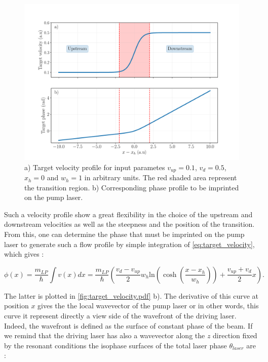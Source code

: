 \begin{figure}[h]
    \centering
    \includegraphics[width=1\textwidth]{chap3_custom_st/fig/target_velocity.pdf}
    \caption{ a) Target velocity profile for input parametes $v_{up}=0.1$, $v_{d}=0.5$, $x_h=0$ and $w_h=1$ in arbitrary units. The red shaded area represent the 
    transition region. b) Corresponding phase profile to be imprinted on the pump laser.}
    \label{fig:target_velocity.pdf}
\end{figure}

Such a velocity profile show a great flexibility in the choice of the upstream and downstream velocities as well as the steepness and the position of the transition. From 
this, one can determine the phase that must be imprinted on the pump laser to generate such a flow profile by simple integration of \autoref{eq:target_velocity}, which gives :

\begin{equation}
    \phi(x) = \dfrac{m_{LP}}{\hbar} \int v(x) dx = \dfrac{m_{LP}}{\hbar} \left( \dfrac{v_{d}-v_{up}}{2} w_h \mathrm{ln}(\cosh(\dfrac{x-x_h}{w_h}))+\dfrac{v_{up}+v_{d}}{2}x \right).
    \label{eq:target_phase_profile}
\end{equation}

The latter is plotted in \autoref{fig:target_velocity.pdf} b). The derivative of this curve at position $x$ gives the the local wavevector of the pump laser or in other words, this curve it represent directly a view side of the wavefront of the driving laser. Indeed, the wavefront is defined as the surface of constant phase of the beam. If we remind that the driving laser has also 
a wavevector along the $z$ direction fixed by the resonant conditions the isophase surfaces of the total laser phase  $\theta_{laser}$ are :

